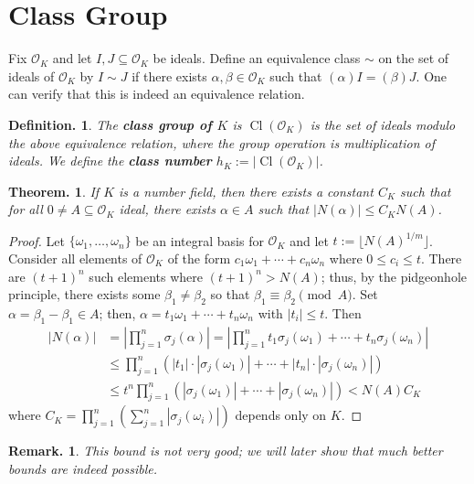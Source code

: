\documentclass[11pt, a4paper]{memoir}
\theoremstyle{change}
\newtheorem{theorem}{Theorem.}[section]
\theoremstyle{plain}
\theoremstyle{nonumberplain}
\newtheorem{definition}{Definition.}
\newtheorem{remark}{Remark.}
\newtheorem{proof}{Proof}
\DeclareMathOperator{\Cl}{Cl}
\newcommand{\mbf}[1]{{\boldmath\bfseries #1}}
\numberwithin{equation}{section}
\begin{document}
\section{Class Group}
Fix $\mathcal{O}_K$ and let $I,J\subseteq\mathcal{O}_K$ be ideals.
Define an equivalence class $\sim$ on the set of ideals of $\mathcal{O}_K$ by $I\sim J$ if there exists $\alpha,\beta\in\mathcal{O}_K$ such that $(\alpha)I=(\beta)J$.
One can verify that this is indeed an equivalence relation.
\begin{definition}
    The \mbf{class group of $K$} is $\Cl(\mathcal{O}_K)$ is the set of ideals modulo the above equivalence relation, where the group operation is multiplication of ideals.
    We define the \mbf{class number} $h_K:=|\Cl(\mathcal{O}_K)|$.
\end{definition}
\begin{theorem}\label{thm:ck}
    If $K$ is a number field, then there exists a constant $C_K$ such that for all $0\neq A\subseteq\mathcal{O}_K$ ideal, there exists $\alpha\in A$ such that $|N(\alpha)|\leq C_K N(A)$.
\end{theorem}
\begin{proof}
    Let $\{\omega_1,\ldots,\omega_n\}$ be an integral basis for $\mathcal{O}_K$ and let $t:=\lfloor N(A)^{1/m}\rfloor$.
    Consider all elements of $\mathcal{O}_K$ of the form $c_1\omega_1+\cdots+c_n\omega_n$ where $0\leq c_i\leq t$.
    There are $(t+1)^n$ such elements where $(t+1)^n>N(A)$; thus, by the pidgeonhole principle, there exists some $\beta_1\neq\beta_2$ so that $\beta_1\equiv\beta_2\pmod{A}$.
    Set $\alpha=\beta_1-\beta_1\in A$; then, $\alpha=t_1\omega_1+\cdots+t_n\omega_n$ with $|t_i|\leq t$.
    Then
    \begin{align*}
        |N(\alpha)| &= \left\lvert\prod_{j=1}^n\sigma_j(\alpha)\right\rvert= \left\lvert\prod_{j=1}^nt_1\sigma_j(\omega_1)+\cdots+t_n\sigma_j(\omega_n)\right\rvert\\
                    &\leq \prod_{j=1}^n\left(|t_1|\cdot|\sigma_j(\omega_1)|+\cdots+|t_n|\cdot|\sigma_j(\omega_n)|\right)\\
                    &\leq t^n\prod_{j=1}^n(|\sigma_j(\omega_1)|+\cdots+|\sigma_j(\omega_n)|)<N(A)C_K
    \end{align*}
    where $C_K=\prod_{j=1}^n\left(\sum_{j=1}^n|\sigma_j(\omega_i)|\right)$ depends only on $K$.
\end{proof}
\begin{remark}
    This bound is not very good; we will later show that much better bounds are indeed possible.
\end{remark}
\end{document}
